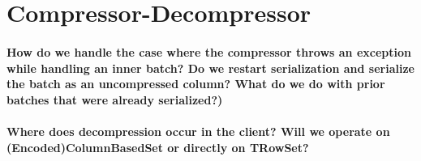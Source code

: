 \documentclass[11pt,a4paper]{article}
\begin{document}
\section{Compressor-Decompressor}
	\paragraph{How do we handle the case where the compressor throws an exception while handling an inner batch? Do we restart serialization and serialize the batch as an uncompressed column? What do we do with prior batches that were already serialized?)}
	
	
	\paragraph{Where does decompression occur in the client? Will we operate on (Encoded)ColumnBasedSet or directly on TRowSet?}
\end{document}
